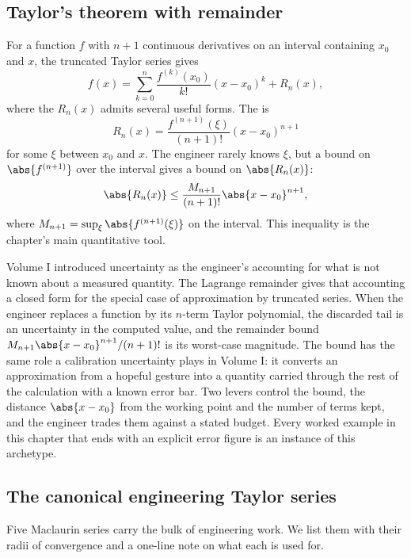 \subsection{Taylor's theorem with remainder}

For a function $f$ with $n+1$ continuous derivatives on an interval
containing $x_{0}$ and $x$, the truncated Taylor series gives
\[
f(x) = \sum_{k=0}^{n} \frac{f^{(k)}(x_{0})}{k!} (x - x_{0})^{k}
+ R_{n}(x),
\]
where the  $R_{n}(x)$ admits several useful forms.
The  is
\[
R_{n}(x) = \frac{f^{(n+1)}(\xi)}{(n+1)!} (x - x_{0})^{n+1}
\]
for some $\xi$ between $x_{0}$ and $x$. The engineer rarely knows
$\xi$, but a bound on $\abs{f^{(n+1)}}$ over the interval gives a bound
on $\abs{R_{n}(x)}$:
\[
\abs{R_{n}(x)} \leq \frac{M_{n+1}}{(n+1)!} \abs{x - x_{0}}^{n+1},
\]
where $M_{n+1} = \sup_{\xi} \abs{f^{(n+1)}(\xi)}$ on the interval. This
inequality is the chapter's main quantitative tool.

\begin{archetype}
Volume I introduced uncertainty as the engineer's accounting for what
is not known about a measured quantity. The Lagrange remainder gives
that accounting a closed form for the special case of approximation by
truncated series. When the engineer replaces a function by its
$n$-term Taylor polynomial, the discarded tail is an uncertainty in the
computed value, and the remainder bound $M_{n+1} \abs{x - x_{0}}^{n+1}/
(n+1)!$ is its worst-case magnitude. The bound has the same role a
calibration uncertainty plays in Volume I: it converts an approximation
from a hopeful gesture into a quantity carried through the rest of the
calculation with a known error bar. Two levers control the bound, the
distance $\abs{x - x_{0}}$ from the working point and the number of
terms kept, and the engineer trades them against a stated budget. Every
worked example in this chapter that ends with an explicit error figure
is an instance of this archetype.
\end{archetype}

\subsection{The canonical engineering Taylor series}

Five Maclaurin series carry the bulk of engineering work. We list them
with their radii of convergence and a one-line note on what each is
used for.

